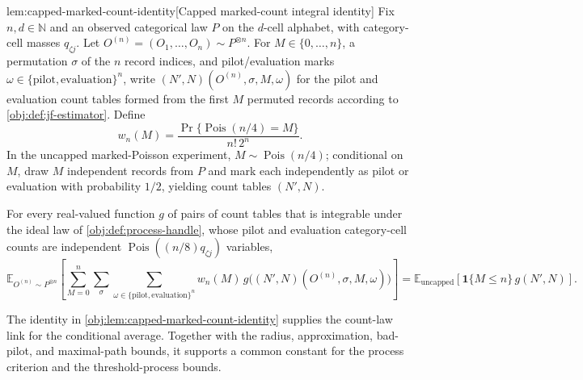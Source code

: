 \begin{lemmav}{lem:capped-marked-count-identity}[Capped marked-count integral identity]
Fix \(n,d\in\mathbb N\) and an observed categorical law \(P\) on the \(d\)-cell alphabet, with category-cell masses \(q_{\zeta j}\). Let \(O^{(n)}=(O_1,\ldots,O_n)\sim P^{\otimes n}\). For \(M\in\{0,\ldots,n\}\), a permutation \(\sigma\) of the \(n\) record indices, and pilot/evaluation marks \(\omega\in\{\mathrm{pilot},\mathrm{evaluation}\}^n\), write \((N',N)(O^{(n)},\sigma,M,\omega)\) for the pilot and evaluation count tables formed from the first \(M\) permuted records according to \cref{obj:def:jf-estimator}. Define
\[
w_n(M)=\frac{\Pr\{\operatorname{Pois}(n/4)=M\}}{n!\,2^n}.
\]
In the uncapped marked-Poisson experiment, \(M\sim\operatorname{Pois}(n/4)\); conditional on \(M\), draw \(M\) independent records from \(P\) and mark each independently as pilot or evaluation with probability \(1/2\), yielding count tables \((N',N)\).

For every real-valued function \(g\) of pairs of count tables that is integrable under the ideal law of \cref{obj:def:process-handle}, whose pilot and evaluation category-cell counts are independent \(\operatorname{Pois}((n/8)q_{\zeta j})\) variables,
\[
\mathbb E_{O^{(n)}\sim P^{\otimes n}}\left[
\sum_{M=0}^{n}\sum_{\sigma}\sum_{\omega\in\{\mathrm{pilot},\mathrm{evaluation}\}^n}
w_n(M)\,
g\bigl((N',N)(O^{(n)},\sigma,M,\omega)\bigr)
\right]
=
\mathbb E_{\mathrm{uncapped}}\left[
\mathbf 1\{M\leq n\}\,g(N',N)
\right].
\]
\end{lemmav}

The identity in \cref{obj:lem:capped-marked-count-identity} supplies the count-law link for the conditional average. Together with the radius, approximation, bad-pilot, and maximal-path bounds, it supports a common constant for the process criterion and the threshold-process bounds.

